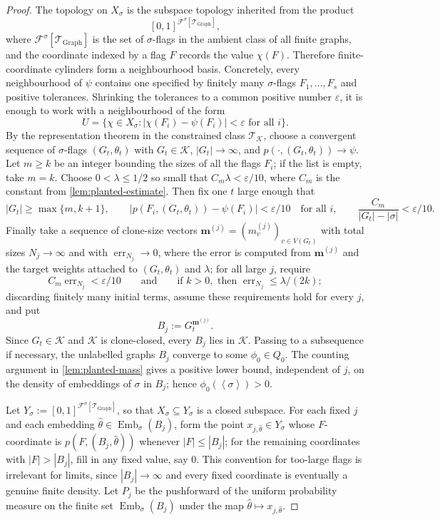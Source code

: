 \documentclass[11pt]{article}
\theoremstyle{definition}
\newcommand{\F}{\mathcal{F}}
\newcommand{\K}{\mathcal{K}}
\newcommand{\T}{\mathcal{T}}
\newcommand{\Emb}{\operatorname{Emb}}
\newcommand{\brak}[1]{\left\langle #1\right\rangle}
\newcommand{\eps}{\varepsilon}
\begin{document}
\begin{proof}
The topology on $X_\sigma$ is the subspace topology inherited from the product
\[
  [0,1]^{\F^\sigma[\T_{\mathrm{Graph}}]},
\]
where $\F^\sigma[\T_{\mathrm{Graph}}]$ is the set of $\sigma$-flags in the
ambient class of all finite graphs, and the coordinate indexed by a flag $F$
records the value $\chi(F)$.
Therefore finite-coordinate cylinders form a neighbourhood basis.  Concretely,
every neighbourhood of $\psi$ contains one specified by finitely many
$\sigma$-flags $F_1,\ldots,F_s$ and positive tolerances.  Shrinking the tolerances
to a common positive number $\eps$, it is enough to work with a neighbourhood of the form
\[
  U=
  \{\chi\in X_\sigma:
    |\chi(F_i)-\psi(F_i)|<\eps\text{ for all }i\}.
\]
By the representation theorem in the constrained class $\T_\K$, choose a
convergent sequence of $\sigma$-flags
$(G_t,\theta_t)$ with $G_t\in\K$, $|G_t|\to\infty$, and
$p(\cdot,(G_t,\theta_t))\to\psi$.  Let $m\ge k$ be an integer bounding the sizes
of all the flags $F_i$; if the list is empty, take $m=k$.
Choose $0<\lambda\le 1/2$ so small that $C_m\lambda<\eps/10$, where $C_m$ is the
constant from \cref{lem:planted-estimate}.  Then fix one $t$ large enough that
\[
  |G_t|\ge\max\{m,k+1\},
  \qquad
  |p(F_i,(G_t,\theta_t))-\psi(F_i)|<\eps/10
  \quad\text{for all }i,
  \qquad
  \frac{C_m}{|G_t|-|\sigma|}<\eps/10.
\]
Finally take a sequence of clone-size vectors
$\mathbf m^{(j)}=(m^{(j)}_v)_{v\in V(G_t)}$ with total sizes $N_j\to\infty$
and with $\operatorname{err}_{N_j}\to0$, where the error is computed from
$\mathbf m^{(j)}$ and the target weights attached to $(G_t,\theta_t)$ and
$\lambda$; for all large $j$, require
\[
  C_m\operatorname{err}_{N_j}<\eps/10
  \qquad
  \text{and}
  \qquad 
  \text{if }k>0,\text{ then } \operatorname{err}_{N_j}\le\lambda/(2k);
\]
discarding finitely many initial terms, assume these requirements hold for every
$j$, and put
\[
  B_j:=G_t^{\mathbf m^{(j)}}.
\]
Since $G_t\in\K$ and $\K$ is clone-closed, every $B_j$ lies in $\K$.  Passing to
a subsequence if necessary, the unlabelled graphs $B_j$ converge to some
$\phi_0\in Q_0$.  The counting argument in \cref{lem:planted-mass} gives a positive
lower bound, independent of $j$, on the density of embeddings of $\sigma$ in $B_j$;
hence $\phi_0(\brak\sigma)>0$.

Let $Y_\sigma:=[0,1]^{\F^\sigma[\T_{\mathrm{Graph}}]}$, so that
$X_\sigma\subseteq Y_\sigma$ is a closed subspace.  For each fixed $j$ and each
embedding $\widehat\theta\in\Emb_\sigma(B_j)$, form the point
$x_{j,\widehat\theta}\in Y_\sigma$ whose $F$-coordinate is
$p(F,(B_j,\widehat\theta))$ whenever $|F|\le |B_j|$; for the remaining
coordinates with $|F|>|B_j|$, fill in any fixed value, say $0$.  This convention
for too-large flags is irrelevant for limits, since $|B_j|\to\infty$ and every
fixed coordinate is eventually a genuine finite density.  Let $P_j$ be the
pushforward of the uniform probability measure on the finite set
$\Emb_\sigma(B_j)$ under the map
$\widehat\theta\mapsto x_{j,\widehat\theta}$.


\end{proof}
\end{document}
